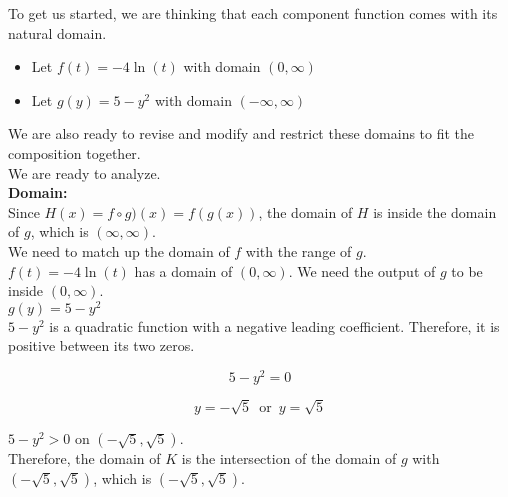\documentclass{ximera}
\begin{document}
To get us started, we are thinking that each component function comes with its natural domain.

\begin{itemize}
\item Let $f(t) = -4 \ln(t)$ with domain $(0, \infty)$ \\
\item Let $g(y) = 5 - y^2$ with domain $(-\infty, \infty)$ \\
\end{itemize}

We are also ready to revise and modify and restrict these domains to fit the composition together. \\




We are ready to analyze. \\




\textbf{\textcolor{blue!55!black}{Domain:}} \\



Since $H(x) = f \circ g)(x) = f(g(x))$, the domain of $H$ is inside the domain of $g$, which is $(\infty, \infty)$. \\

We need to match up the domain of $f$ with the range of $g$. \\


$f(t) = -4 \ln(t)$ has a domain of $(0, \infty)$.  We need the output of $g$ to be inside $(0, \infty)$. \\



$g(y) = 5 - y^2$ \\



$5 - y^2$ is a quadratic function with a negative leading coefficient.  Therefore, it is positive between its two zeros.


\[
5 - y^2 = 0
\]

\[
y = -\sqrt{5}  \,  \text{ or } \, y = \sqrt{5} 
\]




$5 - y^2 > 0$ on $(-\sqrt{5}, \sqrt{5})$. \\




Therefore, the domain of $K$ is the intersection of the domain of $g$ with $(-\sqrt{5}, \sqrt{5})$, which is $(-\sqrt{5}, \sqrt{5})$. \\
\end{document}
